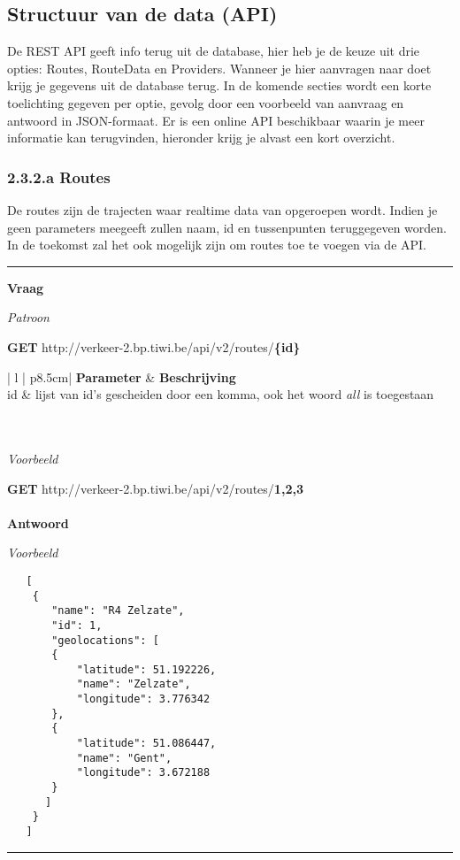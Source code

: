 \documentclass[ps,a4paper,oneside]{report}
\begin{document}
\subsection{Structuur van de data (API)}
De REST API geeft info terug uit de database, hier heb je de keuze uit drie opties: Routes, RouteData en Providers. Wanneer je hier aanvragen naar doet krijg je gegevens uit de database terug. In de komende secties wordt een korte toelichting gegeven per optie, gevolg door een voorbeeld van aanvraag en antwoord in JSON-formaat. Er is een online API beschikbaar waarin je meer informatie kan terugvinden, hieronder krijg je alvast een kort overzicht.

\subsubsection{2.3.2.a Routes}
De routes zijn de trajecten waar realtime data van opgeroepen wordt. Indien je geen parameters meegeeft zullen naam, id en tussenpunten teruggegeven worden. In de toekomst zal het ook mogelijk zijn om routes toe te voegen via de API.\\
\noindent\rule[0.5ex]{\linewidth}{1pt}
\textbf{Vraag}

\textit{Patroon}

\textbf{GET} http://verkeer-2.bp.tiwi.be/api/v2/routes/\textbf{\{id\}}\\

\begin{tabular}{ | l | p{8.5cm}| }
	\hline
	\textbf{Parameter} & \textbf{Beschrijving}\\
	\hline
	id & lijst van id's gescheiden door een komma, ook het woord \textit{all} is toegestaan\\
	\hline
\end{tabular}\\\\

\textit{Voorbeeld}

\textbf{GET} http://verkeer-2.bp.tiwi.be/api/v2/routes/\textbf{1,2,3}\\\\
\textbf{Antwoord}

\textit{Voorbeeld}
\begin{verbatim}
   [
    {
       "name": "R4 Zelzate",
       "id": 1,
       "geolocations": [
       {
           "latitude": 51.192226,
           "name": "Zelzate",
           "longitude": 3.776342
       },
       {
           "latitude": 51.086447,
           "name": "Gent",
           "longitude": 3.672188
       }
      ]
    }
   ]\end{verbatim}
\noindent\rule[0.5ex]{\linewidth}{1pt}
\end{document}
